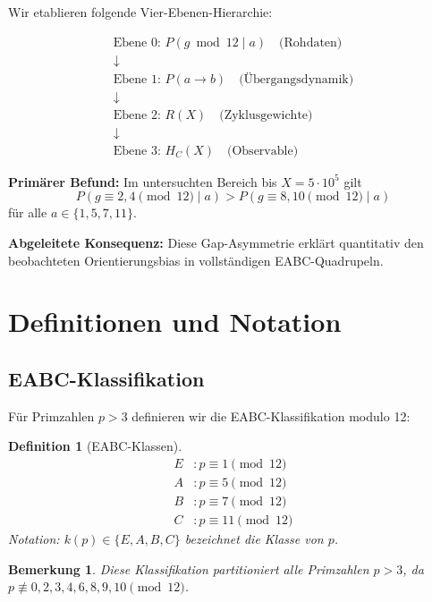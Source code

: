 \documentclass[11pt,a4paper]{article}
\newtheorem{definition}[theorem]{Definition}
\newtheorem{remark}[theorem]{Bemerkung}
\begin{document}
Wir etablieren folgende Vier-Ebenen-Hierarchie:

\begin{equation}
\boxed{
\begin{array}{c}
\text{Ebene 0: } P(g \bmod 12 \mid a) \quad \text{(Rohdaten)} \\
\downarrow \\
\text{Ebene 1: } P(a \to b) \quad \text{(Übergangsdynamik)} \\
\downarrow \\
\text{Ebene 2: } R(X) \quad \text{(Zyklusgewichte)} \\
\downarrow \\
\text{Ebene 3: } H_C(X) \quad \text{(Observable)}
\end{array}
}
\end{equation}

\textbf{Primärer Befund:} Im untersuchten Bereich bis $X = 5 \cdot 10^5$ gilt
\[
P(g \equiv 2,4 \pmod{12} \mid a) > P(g \equiv 8,10 \pmod{12} \mid a)
\]
für alle $a \in \{1, 5, 7, 11\}$.

\textbf{Abgeleitete Konsequenz:} Diese Gap-Asymmetrie erklärt quantitativ den beobachteten Orientierungsbias in vollständigen EABC-Quadrupeln.

\section{Definitionen und Notation}

\subsection{EABC-Klassifikation}

Für Primzahlen $p > 3$ definieren wir die EABC-Klassifikation modulo 12:

\begin{definition}[EABC-Klassen]
\[
\begin{aligned}
E &: p \equiv 1 \pmod{12} \\
A &: p \equiv 5 \pmod{12} \\
B &: p \equiv 7 \pmod{12} \\
C &: p \equiv 11 \pmod{12}
\end{aligned}
\]
Notation: $k(p) \in \{E, A, B, C\}$ bezeichnet die Klasse von $p$.
\end{definition}

\begin{remark}
Diese Klassifikation partitioniert alle Primzahlen $p > 3$, da $p \not\equiv 0, 2, 3, 4, 6, 8, 9, 10 \pmod{12}$.
\end{remark}
\end{document}
